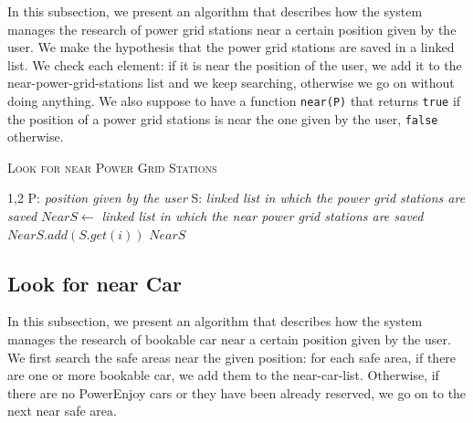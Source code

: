 In this subsection, we present an algorithm that describes how the system manages the research of power grid stations near a certain position given by the user. 
We make the hypothesis that the power grid stations are saved in a linked list.
We check each element: if it is near the position of the user, we add it to the near-power-grid-stations list and we keep searching, otherwise we go on without doing anything.
We also suppose to have a function \texttt{near(P)} that returns \texttt{true} if the position of a power grid stations is near the one given by the user, \texttt{false} otherwise.

\vspace{80pt}
\begin{algorithm}[h!tb]
\caption{\textsc{Look for near Power Grid Stations}}
\label{alg:near-stations}
\begin{algorithmic}[1]
\begin{spacing}{1,2}
\State P: \textit{position given by the user }
\State S: \textit{linked list in which the power grid stations are saved}
\State $NearS \leftarrow $ \textit{linked list in which the near power grid stations are saved}
		\State $NearS.add(S.get(i))$
	\EndIf
\EndFor
\State\Return $NearS$
\EndFunction
\end{spacing}
\end{algorithmic}
\end{algorithm}

\clearpage

\subsection{Look for near Car} \label{subsec:near-car}

In this subsection, we present an algorithm that describes how the system manages the research of bookable car near a certain position given by the user. 
We first search the safe areas near the given position: for each safe area, if there are one or more bookable car, we add them to the near-car-list. Otherwise, if there are no PowerEnjoy cars or they have been already reserved, we go on to the next near safe area.

